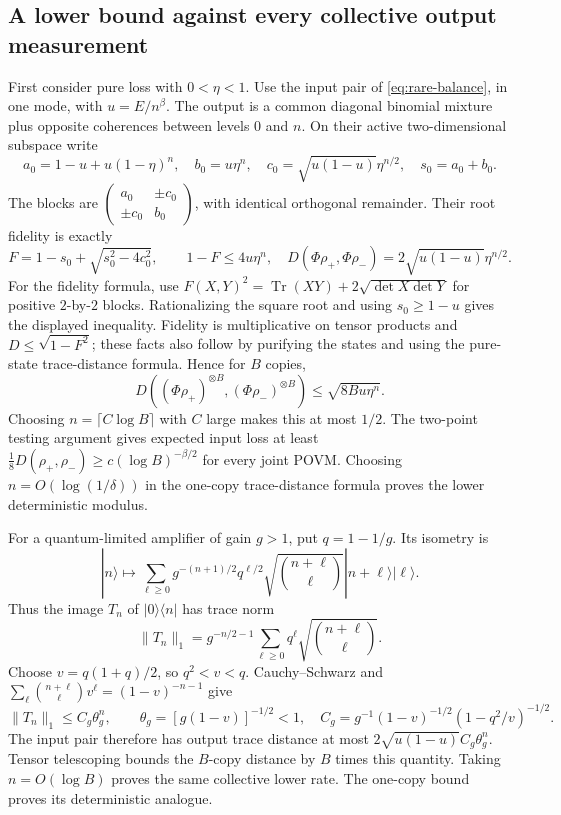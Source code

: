 \documentclass[11pt,a4paper]{article}
\numberwithin{equation}{section}
\begin{document}
\subsection{A lower bound against every collective output measurement}
First consider pure loss with $0<\eta<1$. Use the input pair of
\eqref{eq:rare-balance}, in one mode, with $u=E/n^\beta$.
The output is a common diagonal binomial mixture plus opposite coherences
between levels $0$ and $n$. On their active two-dimensional subspace write
\[
 a_0=1-u+u(1-\eta)^n,\quad b_0=u\eta^n,\quad
 c_0=\sqrt{u(1-u)}\eta^{n/2},\quad s_0=a_0+b_0.
\]
The blocks are $\left(\begin{smallmatrix}a_0&\pm c_0\\\pm c_0&b_0\end{smallmatrix}\right)$,
with identical orthogonal remainder. Their root fidelity is exactly
\[
 F=1-s_0+\sqrt{s_0^2-4c_0^2},\qquad
 1-F\le4u\eta^n,
 \quad D(\Phi\rho_+,\Phi\rho_-)=2\sqrt{u(1-u)}\eta^{n/2}.
 \tag{D.11}\label{eq:loss-fidelity}
\]
For the fidelity formula, use
$F(X,Y)^2=\operatorname{Tr}(XY)+2\sqrt{\det X\det Y}$ for positive
$2$-by-$2$ blocks. Rationalizing the square root and using $s_0\ge1-u$
gives the displayed inequality.
Fidelity is multiplicative on tensor products and
$D\le\sqrt{1-F^2}$; these facts also follow by purifying the states and
using the pure-state trace-distance formula. Hence for $B$ copies,
\[
 D((\Phi\rho_+)^{\otimes B},(\Phi\rho_-)^{\otimes B})
                   \le\sqrt{8Bu\eta^n}.
 \tag{D.12}\label{eq:loss-collective}
\]
Choosing $n=\lceil C\log B\rceil$ with $C$ large makes this at most $1/2$.
The two-point testing argument gives expected input loss at least
$\tfrac18D(\rho_+,\rho_-)\ge c(\log B)^{-\beta/2}$ for every joint POVM.
Choosing $n=O(\log(1/\delta))$ in the one-copy trace-distance formula proves
the lower deterministic modulus.

For a quantum-limited amplifier of gain $g>1$, put $q=1-1/g$.
Its isometry is
\[
 |n\rangle\mapsto\sum_{\ell\ge0}
   g^{-(n+1)/2}q^{\ell/2}\sqrt{\binom{n+\ell}{\ell}}
                    |n+\ell\rangle|\ell\rangle.
\]
Thus the image $T_n$ of $|0\rangle\langle n|$ has trace norm
\[
 \|T_n\|_1=g^{-n/2-1}\sum_{\ell\ge0}q^\ell
                               \sqrt{\binom{n+\ell}{\ell}}.
\]
Choose $v=q(1+q)/2$, so $q^2<v<q$. Cauchy--Schwarz and
$\sum_\ell\binom{n+\ell}{\ell}v^\ell=(1-v)^{-n-1}$ give
\[
 \|T_n\|_1\le C_g\theta_g^n,\qquad
 \theta_g=[g(1-v)]^{-1/2}<1,
 \quad C_g=g^{-1}(1-v)^{-1/2}(1-q^2/v)^{-1/2}.
 \tag{D.13}\label{eq:amplifier-cross}
\]
The input pair therefore has output trace distance at most
$2\sqrt{u(1-u)}C_g\theta_g^n$. Tensor telescoping bounds the $B$-copy
distance by $B$ times this quantity. Taking $n=O(\log B)$ proves the same
collective lower rate. The one-copy bound proves its deterministic analogue.
\end{document}
